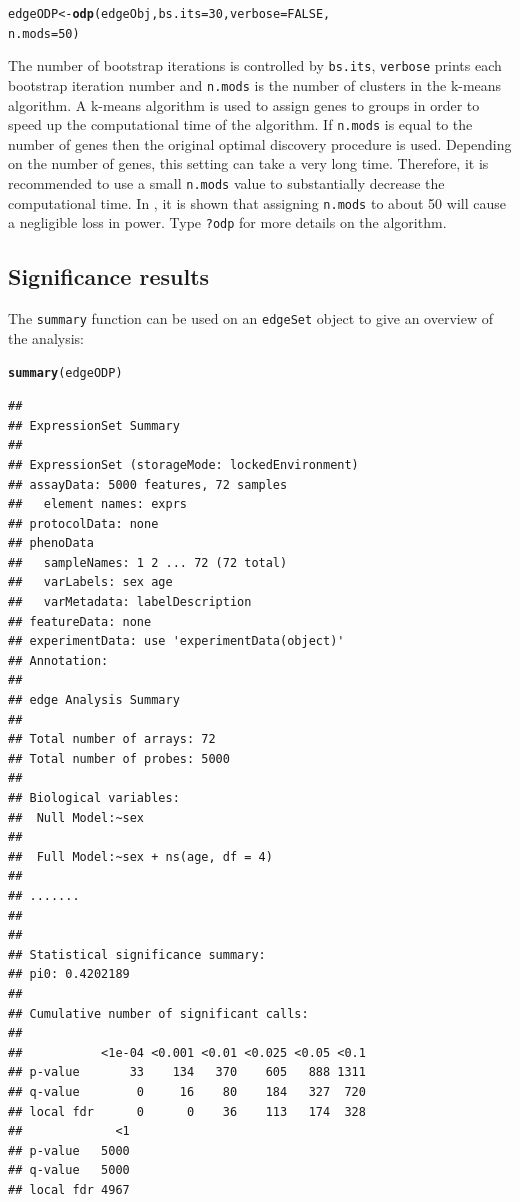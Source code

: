 \documentclass{article}\usepackage[]{graphicx}\usepackage[]{color}
\makeatletter
\newcommand{\hlnum}[1]{\textcolor[rgb]{0.686,0.059,0.569}{#1}}%
\newcommand{\hlstd}[1]{\textcolor[rgb]{0.345,0.345,0.345}{#1}}%
\newcommand{\hlkwb}[1]{\textcolor[rgb]{0.69,0.353,0.396}{#1}}%
\newcommand{\hlkwc}[1]{\textcolor[rgb]{0.333,0.667,0.333}{#1}}%
\newcommand{\hlkwd}[1]{\textcolor[rgb]{0.737,0.353,0.396}{\textbf{#1}}}%
\newenvironment{kframe}{%
 \def\at@end@of@kframe{}%
 \ifinner\ifhmode%
  \def\at@end@of@kframe{\end{minipage}}%
  \begin{minipage}{\columnwidth}%
 \fi\fi%
 \def\FrameCommand##1{\hskip\@totalleftmargin \hskip-\fboxsep
 \colorbox{shadecolor}{##1}\hskip-\fboxsep
     \hskip-\linewidth \hskip-\@totalleftmargin \hskip\columnwidth}%
 \MakeFramed {\advance\hsize-\width
   \@totalleftmargin\z@ \linewidth\hsize
   \@setminipage}}%
 {\par\unskip\endMakeFramed%
 \at@end@of@kframe}
\newenvironment{knitrout}{}{} %
\makeatother
\begin{document}
\begin{knitrout}
\color{fgcolor}\begin{kframe}
\begin{alltt}
\hlstd{edgeODP} \hlkwb{<-} \hlkwd{odp}\hlstd{(edgeObj,} \hlkwc{bs.its} \hlstd{=} \hlnum{30}\hlstd{,} \hlkwc{verbose} \hlstd{=} \hlnum{FALSE}\hlstd{,}
    \hlkwc{n.mods} \hlstd{=} \hlnum{50}\hlstd{)}
\end{alltt}
\end{kframe}
\end{knitrout}
The number of bootstrap iterations is controlled by {\tt bs.its}, {\tt verbose} prints each bootstrap iteration number and {\tt n.mods} is the number of clusters in the k-means algorithm. A k-means algorithm is used to assign genes to groups in order to speed up the computational time of the algorithm. If {\tt n.mods} is equal to the number of genes then the original optimal discovery procedure is used. Depending on the number of genes, this setting can take a very long time.  Therefore, it is recommended to use a small {\tt n.mods} value to substantially decrease the computational time. In \cite{woo:leek:storey:2011}, it is shown that assigning {\tt n.mods} to about 50 will cause a negligible loss in power. Type {\tt ?odp} for more details on the algorithm.

\subsection{Significance results}
The {\tt summary} function can be used on an {\tt edgeSet} object to give an overview of the analysis:
\begin{knitrout}
\color{fgcolor}\begin{kframe}
\begin{alltt}
\hlkwd{summary}\hlstd{(edgeODP)}
\end{alltt}
\begin{verbatim}
## 
## ExpressionSet Summary 
##  
## ExpressionSet (storageMode: lockedEnvironment)
## assayData: 5000 features, 72 samples 
##   element names: exprs 
## protocolData: none
## phenoData
##   sampleNames: 1 2 ... 72 (72 total)
##   varLabels: sex age
##   varMetadata: labelDescription
## featureData: none
## experimentData: use 'experimentData(object)'
## Annotation:  
## 
## edge Analysis Summary 
##  
## Total number of arrays: 72 
## Total number of probes: 5000 
##  
## Biological variables: 
## 	Null Model:~sex
## 
## 	Full Model:~sex + ns(age, df = 4)
## 
## ....... 
##  
## 
## Statistical significance summary:
## pi0:	0.4202189	
## 
## Cumulative number of significant calls:
## 
##           <1e-04 <0.001 <0.01 <0.025 <0.05 <0.1
## p-value       33    134   370    605   888 1311
## q-value        0     16    80    184   327  720
## local fdr      0      0    36    113   174  328
##             <1
## p-value   5000
## q-value   5000
## local fdr 4967
\end{verbatim}
\end{kframe}
\end{knitrout}
\end{document}
